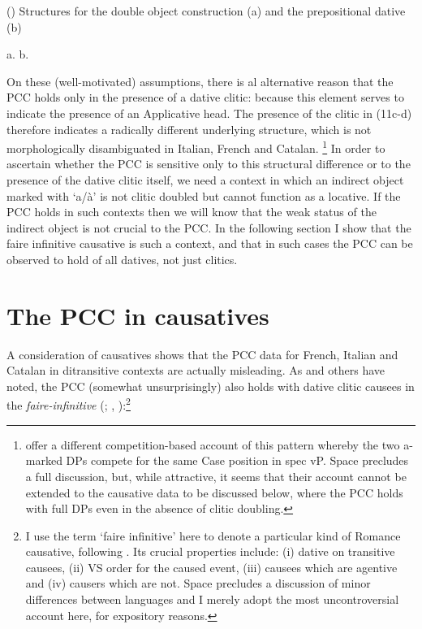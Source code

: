 \documentclass[output=paper,modfonts,nonflat]{langsci/langscibook}
\begin{document}
()  Structures for the double object construction (a) and the prepositional dative (b)

 

 

a.   b. 

On these (well-motivated) assumptions, there is al alternative reason that the PCC holds only in the presence of a dative clitic:  because this element serves to indicate the presence of an Applicative head. The presence of the clitic in (11c-d) therefore indicates a radically different underlying structure, which is not morphologically disambiguated in Italian, French and Catalan.\textstyleFootnoteSymbol{} \footnote{\citet{OrmazabalRomero2013} offer a different competition-based account of this pattern whereby the two a-marked DPs compete for the same Case position in spec vP. Space precludes a full discussion, but, while attractive, it seems that their account cannot be extended to the causative data to be discussed below, where the PCC holds with full DPs even in the absence of clitic doubling.} In order to ascertain whether the PCC is sensitive only to this structural difference or to the presence of the dative clitic itself, we need a context in which an indirect object marked with ‘a/à’ is not clitic doubled but cannot function as a locative. If the PCC holds in such contexts then we will know that the weak status of the indirect object is not crucial to the PCC. In the following section I show that the faire infinitive causative is such a context, and that in such cases the PCC can be observed to hold of all datives, not just clitics.

\section{The PCC in causatives} %

A consideration of causatives shows that the PCC data for French, Italian and Catalan in ditransitive contexts are actually misleading. As \citet{Bonet1991} and others have noted, the PCC (somewhat unsurprisingly) also holds with dative clitic causees in the \textit{faire-infinitive} (\citealt{Postal1981}; \citealt{Quicoli1984}, \citealt{Rezac2008}):\footnote{I use the term ‘faire infinitive’ here to denote a particular kind of Romance causative, following \citet{Kayne1975}. Its crucial properties include: (i) dative on transitive causees, (ii) VS order for the caused event, (iii) causees which are agentive and (iv) causers which are not. Space precludes a discussion of minor differences between languages and I merely adopt the most uncontroversial account here, for expository reasons.} 
\end{document}
